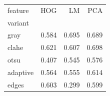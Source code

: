 \begin{tabular}{lrrr}
\toprule
feature & HOG & LM & PCA \\
variant &  &  &  \\
\midrule
gray & 0.584 & 0.695 & 0.689 \\
clahe & 0.621 & 0.607 & 0.698 \\
otsu & 0.407 & 0.545 & 0.576 \\
adaptive & 0.564 & 0.555 & 0.614 \\
edges & 0.603 & 0.299 & 0.599 \\
\bottomrule
\end{tabular}
